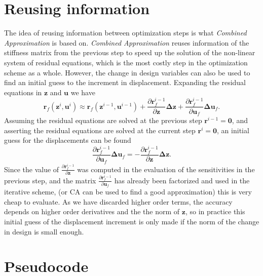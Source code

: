 \documentclass{article}
\begin{document}
\section{Reusing information}
The idea of reusing information between optimization steps is what \textit{Combined Approximation} is based on. \textit{Combined Approximation} reuses information of the stiffness matrix from the previous step to speed up the solution of the non-linear system of residual equations, which is the most costly step in the optimization scheme as a whole. However, the change in design variables can also be used to find an initial guess to the increment in displacement. Expanding the residual equations in $\bm z$ and $\bm u$ we have
$$
\bm r_{f}(\bm z^{i}, \bm u^{i}) \approx \bm r_{f}(\bm z^{i-1}, \bm u^{i - 1}) + \frac{\partial \bm r^{i-1}_{f}}{\partial \bm z}\bm \Delta \bm z + \frac{\partial \bm r^{i-1}_{f}}{\partial \bm u_f}\bm \Delta \bm u_f.
$$
Assuming the residual equations are solved at the previous step $\bm r^{i-1} = \bm 0$, and asserting the residual equations are solved at the current step $\bm r^{i} = \bm 0$, an initial guess for the displacements can be found
$$
\frac{\partial \bm r^{i-1}_{f}}{\partial \bm u_f}\bm \Delta \bm u_f = -\frac{\partial \bm r^{i-1}_{f}}{\partial \bm z}\bm \Delta \bm z.
$$
Since the value of $\frac{\partial \bm r^{i-1}_{f}}{\partial \bm z}$ was computed in the evaluation of the sensitivities in the previous step, and the matrix $\frac{\partial \bm r^{i-1}_{f}}{\partial \bm u_f}$ has already been factorized and used in the iterative scheme, (or CA can be used to find a good approximation) this is very cheap to evaluate.
As we have discarded higher order terms, the accuracy depends on higher order derivatives and the the norm of $\bm z$, so in practice this initial guess of the displacement increment is only made if the norm of the change in design is small enough.
\section{Pseudocode}

\end{document}

